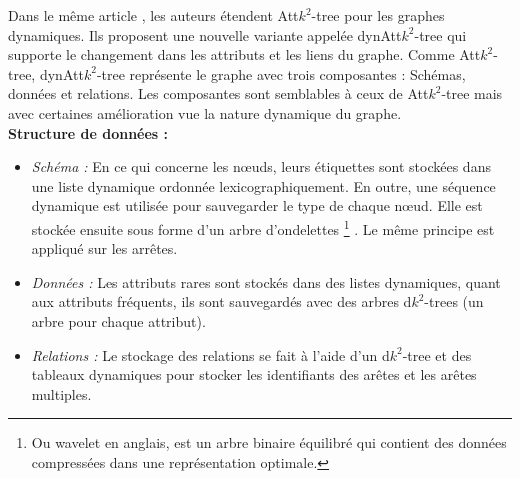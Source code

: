 Dans le même article \citep{alvarez2018compact}, les auteurs étendent Att$k^2$-tree pour les graphes dynamiques. Ils proposent une nouvelle variante appelée dynAtt$k^2$-tree qui supporte le changement dans les attributs et les liens du graphe. Comme Att$k^2$-tree, dynAtt$k^2$-tree représente le graphe avec trois composantes : Schémas, données et relations. Les composantes sont semblables à ceux de Att$k^2$-tree mais avec certaines amélioration vue la nature dynamique du graphe.\\
\textbf{Structure de données : } 
\begin{itemize}
\item \textit{Schéma :}  En ce qui concerne les nœuds, leurs étiquettes sont stockées dans une liste dynamique ordonnée lexicographiquement. En outre, une séquence dynamique est utilisée pour sauvegarder le type de chaque nœud. Elle est stockée ensuite sous forme d'un arbre d'ondelettes \footnote{Ou wavelet en anglais, est un arbre binaire équilibré qui contient des données compressées dans une représentation optimale.} \citep{grossi2003high}. Le même principe est appliqué sur les arrêtes. 
\item \textit{Données :} Les attributs rares sont stockés dans des listes dynamiques, quant aux attributs fréquents, ils sont sauvegardés avec des arbres d$k^2$-trees (un arbre pour chaque attribut).
\item \textit{Relations :} Le stockage des relations se fait à l'aide d'un d$k^2$-tree et des tableaux dynamiques pour stocker les identifiants des arêtes et les arêtes multiples.
\end{itemize}




























